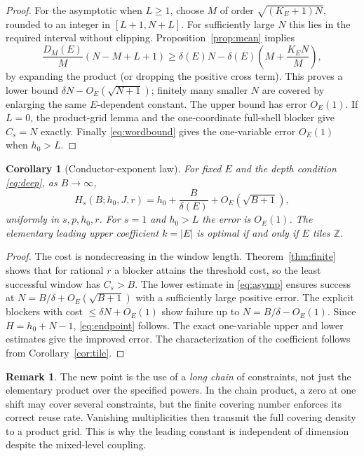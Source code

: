 \documentclass[11pt]{article}
\newtheorem{corollary}[theorem]{Corollary}
\theoremstyle{definition}
\newtheorem{remark}[theorem]{Remark}
\newcommand{\Z}{\mathbb Z}
\begin{document}
\begin{proof}
For the asymptotic when $L\ge1$, choose $M$ of order $\sqrt{(K_E+1)N}$, rounded to an integer in $[L+1,N+L]$. For sufficiently large $N$ this lies in the required interval without clipping. Proposition~\ref{prop:mean} implies
\[
 \frac{D_M(E)}M(N-M+L+1)
 \ge\delta(E)N-\delta(E)\left(M+\frac{K_E N}{M}\right),
\]
by expanding the product (or dropping the positive cross term). This proves a lower bound $\delta N-O_E(\sqrt{N+1})$; finitely many smaller $N$ are covered by enlarging the same $E$-dependent constant. The upper bound has error $O_E(1)$. If $L=0$, the product-grid lemma and the one-coordinate full-shell blocker give $C_s=N$ exactly. Finally \eqref{eq:wordbound} gives the one-variable error $O_E(1)$ when $h_0>L$.
\end{proof}

\begin{corollary}[Conductor-exponent law]\label{cor:endpoint}
For fixed $E$ and the depth condition \eqref{eq:deep}, as $B\to\infty$,
\begin{equation}\label{eq:endpoint}
 H_s(B;h_0,J,r)=h_0+\frac B{\delta(E)}+O_E(\sqrt{B+1}),
\end{equation}
uniformly in $s,p,h_0,r$. For $s=1$ and $h_0>L$ the error is $O_E(1)$. The elementary leading upper coefficient $k=|E|$ is optimal if and only if $E$ tiles $\Z$.
\end{corollary}
\begin{proof}
The cost is nondecreasing in the window length. Theorem~\ref{thm:finite} shows that for rational $r$ a blocker attains the threshold cost, so the least successful window has $C_s>B$. The lower estimate in \eqref{eq:asymp} ensures success at $N=B/\delta+O_E(\sqrt{B+1})$ with a sufficiently large positive error. The explicit blockers with cost $\le\delta N+O_E(1)$ show failure up to $N=B/\delta-O_E(1)$. Since $H=h_0+N-1$, \eqref{eq:endpoint} follows. The exact one-variable upper and lower estimates give the improved error. The characterization of the coefficient follows from Corollary~\ref{cor:tile}.
\end{proof}

\begin{remark}
The new point is the use of a \emph{long chain} of constraints, not just the elementary product over the specified powers. In the chain product, a zero at one shift may cover several constraints, but the finite covering number enforces its correct reuse rate. Vanishing multiplicities then transmit the full covering density to a product grid. This is why the leading constant is independent of dimension despite the mixed-level coupling.
\end{remark}
\end{document}
